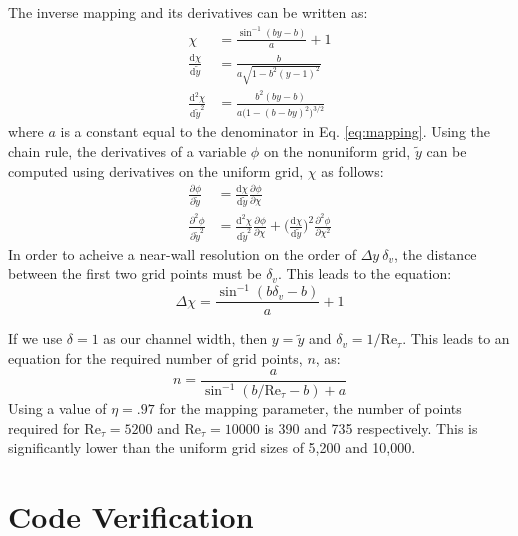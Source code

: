 \documentclass[a4paper,11pt]{article}
\newcommand{\pderiv}[3][]{%
  \ensuremath{\frac{\partial^{#1} {#2}}{\partial {#3}^{#1}}}}
\begin{document}
The inverse mapping and its derivatives can be written as:
\begin{align}
  \chi &= \frac{\sin^{-1}(by-b)}{a} + 1 \\
  \frac{\mathrm{d}\chi}{\mathrm{d}\tilde{y}} &= \frac{b}{a \sqrt{1-b^2(y-1)^2}} \label{eq:chi-y-1} \\
  \frac{\mathrm{d}^2\chi}{\mathrm{d}\tilde{y}^2} &= \frac{b^2(by-b)}{a\big(1-(b-by)^2\big)^{3/2}} \label{eq:chi-y-2}
\end{align}
where $a$ is a constant equal to the denominator in Eq. \ref{eq:mapping}.  Using the chain rule, the derivatives of a variable $\phi$ on the nonuniform grid, $\tilde{y}$ can be computed using derivatives on the uniform grid, $\chi$ as follows:
\begin{align}
 \pderiv{\phi}{\tilde{y}} &= \frac{\mathrm{d}\chi}{\mathrm{d}\tilde{y}} \pderiv{\phi}{\chi} \label{eq:phi-y-1} \\
 \pderiv[2]{\phi}{\tilde{y}} &= \frac{\mathrm{d}^2\chi}{\mathrm{d}\tilde{y}^2} \pderiv{\phi}{\chi} + \Big(\frac{\mathrm{d}\chi}{\mathrm{d}\tilde{y}} \Big)^2 \pderiv[2]{\phi}{\chi}  \label{eq:phi-y-2} 
\end{align}
In order to acheive a near-wall resolution on the order of $\Delta y ~ \delta_v$, the distance between the first two grid points must be $\delta_v$.  This leads to the equation:
\begin{equation}
 \Delta \chi = \frac{\sin^{-1}(b\delta_v -b)}{a}+1
\end{equation}

If we use $\delta = 1$ as our channel width, then $y = \tilde{y}$ and $\delta_v = 1/\mathrm{Re}_{\tau}$.  This leads to an equation for the required number of grid points, $n$, as:
\begin{equation}
 n = \frac{a}{\sin^{-1}(b/\mathrm{Re}_{\tau}-b)+a}
\end{equation}
Using a value of $\eta = .97$ for the mapping parameter, the number of points required for $\mathrm{Re}_{\tau}=5200$ and $\mathrm{Re}_{\tau}=10000$ is 390 and 735 respectively. This is significantly lower than the uniform grid sizes of 5,200 and 10,000.


\section{Code Verification}
\end{document}
